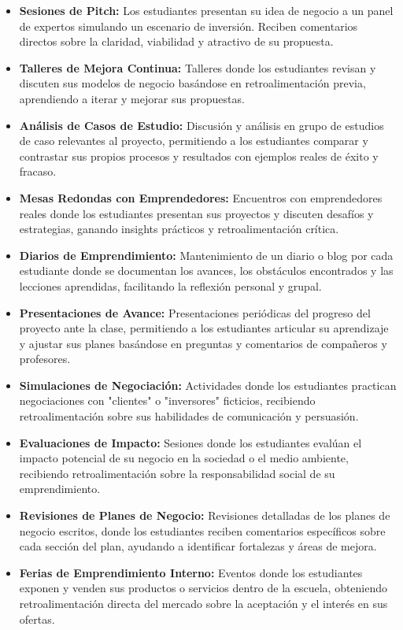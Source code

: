 \begin{itemize}
    \item \textbf{Sesiones de Pitch:} Los estudiantes presentan su idea de negocio a un panel de expertos simulando un escenario de inversión. Reciben comentarios directos sobre la claridad, viabilidad y atractivo de su propuesta.
    \item \textbf{Talleres de Mejora Continua:} Talleres donde los estudiantes revisan y discuten sus modelos de negocio basándose en retroalimentación previa, aprendiendo a iterar y mejorar sus propuestas.
    \item \textbf{Análisis de Casos de Estudio:} Discusión y análisis en grupo de estudios de caso relevantes al proyecto, permitiendo a los estudiantes comparar y contrastar sus propios procesos y resultados con ejemplos reales de éxito y fracaso.
    \item \textbf{Mesas Redondas con Emprendedores:} Encuentros con emprendedores reales donde los estudiantes presentan sus proyectos y discuten desafíos y estrategias, ganando insights prácticos y retroalimentación crítica.
    \item \textbf{Diarios de Emprendimiento:} Mantenimiento de un diario o blog por cada estudiante donde se documentan los avances, los obstáculos encontrados y las lecciones aprendidas, facilitando la reflexión personal y grupal.
    \item \textbf{Presentaciones de Avance:} Presentaciones periódicas del progreso del proyecto ante la clase, permitiendo a los estudiantes articular su aprendizaje y ajustar sus planes basándose en preguntas y comentarios de compañeros y profesores.
    \item \textbf{Simulaciones de Negociación:} Actividades donde los estudiantes practican negociaciones con "clientes" o "inversores" ficticios, recibiendo retroalimentación sobre sus habilidades de comunicación y persuasión.
    \item \textbf{Evaluaciones de Impacto:} Sesiones donde los estudiantes evalúan el impacto potencial de su negocio en la sociedad o el medio ambiente, recibiendo retroalimentación sobre la responsabilidad social de su emprendimiento.
    \item \textbf{Revisiones de Planes de Negocio:} Revisiones detalladas de los planes de negocio escritos, donde los estudiantes reciben comentarios específicos sobre cada sección del plan, ayudando a identificar fortalezas y áreas de mejora.
    \item \textbf{Ferias de Emprendimiento Interno:} Eventos donde los estudiantes exponen y venden sus productos o servicios dentro de la escuela, obteniendo retroalimentación directa del mercado sobre la aceptación y el interés en sus ofertas.
\end{itemize}
